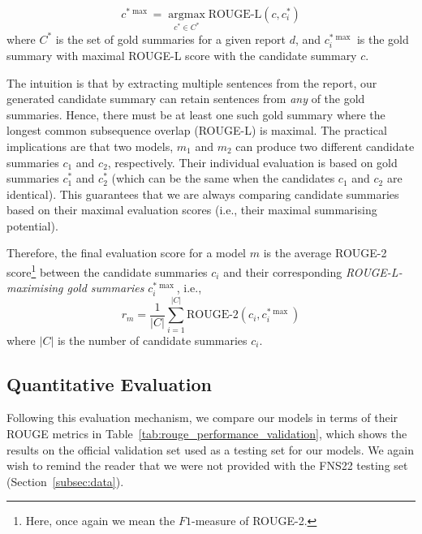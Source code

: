 \begin{equation}\label{eq:rouge_max}
    c^{*\max} = \underset{c^{*} \in C^{*}}{\operatorname{argmax}} \text{ROUGE-L}(c, c^{*}_{i})
\end{equation}
where $C^{*}$ is the set of gold summaries for a given report $d$, and $c^{*\max}_{i}$ is the gold summary with maximal ROUGE-L score with the candidate summary $c$.

The intuition is that by extracting multiple sentences from the report, our generated candidate summary can
retain sentences from \emph{any} of the gold summaries.
Hence, there must be at least one such gold summary where the longest common subsequence overlap (ROUGE-L) is maximal.
The practical implications are that two models, $m_{1}$ and $m_{2}$ can produce two different candidate summaries
$c_{1}$ and $c_{2}$, respectively.
Their individual evaluation is based on gold summaries $c^{*}_{1}$ and $c^{*}_{2}$ (which can be the same when the
candidates $c_{1}$ and $c_{2}$ are identical).
This guarantees that we are always comparing candidate summaries based on their maximal evaluation scores (i.e., their maximal summarising potential).

Therefore, the final evaluation score for a model $m$ is the average ROUGE-2 score\footnote{
    Here, once again we mean the $F1$-measure of ROUGE-2.
} between the candidate summaries $c_{i}$ and their corresponding \emph{ROUGE-L-maximising gold summaries} $c^{*\max}_{i}$, i.e.,
\begin{equation}\label{eq:rouge_final}
    r_{m} = \frac{1}{|C|} \sum_{i=1}^{|C|} \text{ROUGE-2}(c_{i}, c^{*\max}_{i})
\end{equation}
where $|C|$ is the number of candidate summaries $c_{i}$.

\subsection{Quantitative Evaluation}\label{subsec:quantitative-evaluation}
Following this evaluation mechanism, we compare our models in terms of their ROUGE metrics in Table~\ref{tab:rouge_performance_validation}, which
shows the results on the official validation set used as a testing set for our models.
We again wish to remind the reader that we were not provided with the FNS22 testing set (Section~\ref{subsec:data}).

